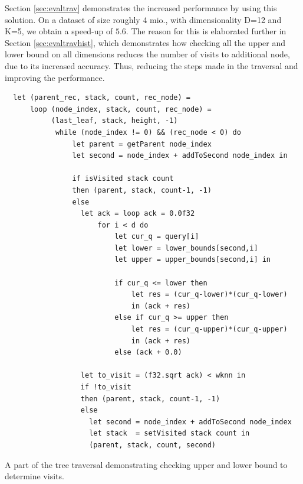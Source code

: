\noindent Section \ref{sec:evaltrav} demonstrates the increased performance by using this solution. On a dataset of size roughly 4 mio., with dimensionality D=12 and K=5, we obtain a speed-up of $5.6$. The reason for this is elaborated further in Section \ref{sec:evaltravhist}, which demonstrates how checking all the upper and lower bound on all dimensions reduces the number of visits to additional node, due to its increased accuracy. Thus, reducing the steps made in the traversal and improving the performance. 


\begin{listing}[H]
\begin{verbatim}
  let (parent_rec, stack, count, rec_node) =
      loop (node_index, stack, count, rec_node) =
           (last_leaf, stack, height, -1)
            while (node_index != 0) && (rec_node < 0) do
                let parent = getParent node_index
                let second = node_index + addToSecond node_index in

                if isVisited stack count
                then (parent, stack, count-1, -1)
                else
                  let ack = loop ack = 0.0f32
                      for i < d do
                          let cur_q = query[i]
                          let lower = lower_bounds[second,i]
                          let upper = upper_bounds[second,i] in

                          if cur_q <= lower then
                              let res = (cur_q-lower)*(cur_q-lower)
                              in (ack + res)
                          else if cur_q >= upper then
                              let res = (cur_q-upper)*(cur_q-upper)
                              in (ack + res)
                          else (ack + 0.0)

                  let to_visit = (f32.sqrt ack) < wknn in
                  if !to_visit
                  then (parent, stack, count-1, -1)
                  else
                    let second = node_index + addToSecond node_index
                    let stack  = setVisited stack count in
                    (parent, stack, count, second)
\end{verbatim}
\caption{A part of the tree traversal demonstrating checking upper and lower bound to determine visits.}
\label{lst:traverse1}
\end{listing}



